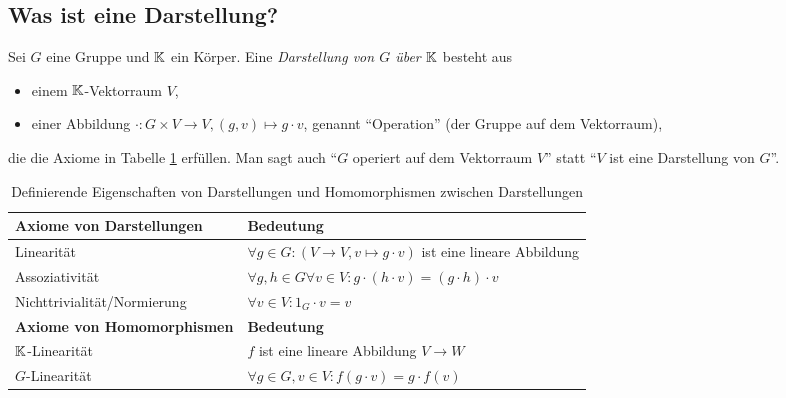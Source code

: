 
\subsection{Was ist eine Darstellung?}

\begin{definition}[Darstellungen]\label{darstellungen:def}
Sei $G$ eine Gruppe und $\mathbb{K}$ ein Körper. Eine \emph{Darstellung von $G$ über $\mathbb{K}$} besteht aus
\begin{itemize}
	\item einem $\mathbb{K}$-Vektorraum $V$,
	\item einer Abbildung $\cdot: G \times V \to V, (g,v) \mapsto g\cdot v$, genannt \enquote{Operation} (der Gruppe auf dem Vektorraum),
\end{itemize}
die die Axiome in Tabelle \ref{darstellungen:def_table} erfüllen. Man sagt auch \enquote{$G$ operiert auf dem Vektorraum $V$} statt \enquote{$V$ ist eine Darstellung von $G$}.

\begin{table}[!ht]
	\setlength\extrarowheight{10pt} %
	\begin{tabularx}{\textwidth}{p{7cm} X}
		
		\toprule
		\textbf{Axiome von Darstellungen}                    & \textbf{Bedeutung} \\
		\midrule
        \hspace{1cm}Linearität                               & $\forall g\in G: (V\to V, v\mapsto g\cdot v)$ ist eine lineare Abbildung \\
		\hspace{1cm}Assoziativität                           & $\forall g,h\in G\forall v\in V: g\cdot (h\cdot v)=(g\cdot h)\cdot v$  \\
		\hspace{1cm}Nichttrivialität/Normierung              & $\forall v\in V: 1_G\cdot v=v$  \\
		\textbf{Axiome von Homomorphismen}                   & \textbf{Bedeutung} \\
        \midrule
        \hspace{1cm}$\mathbb{K}$-Linearität & $f$ ist eine lineare Abbildung $V\to W$ \\
        \hspace{1cm}$G$-Linearität & $\forall g\in G, v\in V: f(g\cdot v) = g\cdot f(v)$ \\
        \bottomrule
	\end{tabularx}
	\caption{Definierende Eigenschaften von Darstellungen und Homomorphismen zwischen Darstellungen}
    \label{darstellungen:def_table}
\end{table}


\end{definition}
